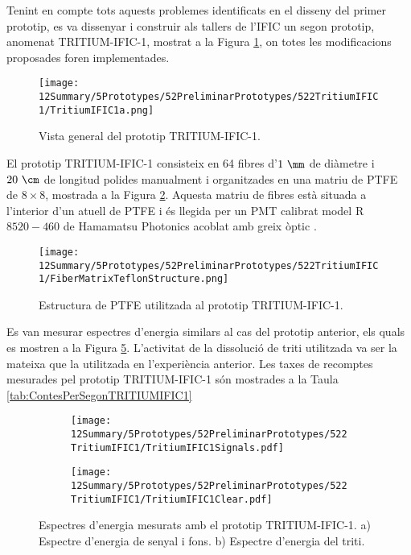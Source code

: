 Tenint en compte tots aquests problemes identificats en el disseny del primer prototip, es va dissenyar i construir als tallers de l'IFIC un segon prototip, anomenat TRITIUM-IFIC-1, mostrat a la Figura \ref{fig:TritumIFIC1s}, on totes les modificacions proposades foren implementades.
\begin{figure}[h]
\centering
\texttt{[image: 12Summary/5Prototypes/52PreliminarPrototypes/522TritiumIFIC1/TritiumIFIC1a.png]}
\caption{Vista general del prototip TRITIUM-IFIC-1.\label{fig:TritumIFIC1s}}
\end{figure}
El prototip TRITIUM-IFIC-1 consisteix en 64 fibres d'$1~\mm$ de diàmetre i $20~\cm$ de longitud polides manualment i organitzades en una matriu de PTFE de $8\times 8$, mostrada a la Figura \ref{fig:EstructuraPTFEFibresTritiumIFIC1}. Aquesta matriu de fibres està situada a l'interior d'un atuell de PTFE i és llegida per un PMT calibrat model R$8520-460$ de Hamamatsu Photonics \cite{DataSheetPMTs} acoblat amb greix òptic \cite{OpticalGrease}.
\begin{figure}[h]
\centering
\texttt{[image: 12Summary/5Prototypes/52PreliminarPrototypes/522TritiumIFIC1/FiberMatrixTeflonStructure.png]}
\caption{Estructura de PTFE utilitzada al prototip TRITIUM-IFIC-1.\label{fig:EstructuraPTFEFibresTritiumIFIC1}}
\end{figure}
Es van mesurar espectres d'energia similars al cas del prototip anterior, els quals es mostren a la Figura \ref{fig:EspectresEnergeticsTRITIUMIFIC1}. L'activitat de la dissolució de triti utilitzada va ser la mateixa que la utilitzada en l'experiència anterior. Les taxes de recomptes mesurades pel prototip TRITIUM-IFIC-1 són mostrades a la Taula \ref{tab:ContesPerSegonTRITIUMIFIC1}

\begin{figure}
\centering
    \begin{subfigure}[b]{1\textwidth}
    \centering
    \texttt{[image: 12Summary/5Prototypes/52PreliminarPrototypes/522TritiumIFIC1/TritiumIFIC1Signals.pdf]}  
    \caption{\label{subfig:EspectreEnergeticSenyalFonsTritiumIFIC1}}
    \end{subfigure}
    \hfill
    \begin{subfigure}[b]{1\textwidth}
    \centering
    \texttt{[image: 12Summary/5Prototypes/52PreliminarPrototypes/522TritiumIFIC1/TritiumIFIC1Clear.pdf]}  
    \caption{\label{subfig:EspectreEnergeticTritiTritiumIFIC1}}
    \end{subfigure}
 \caption{Espectres d'energia mesurats amb el prototip TRITIUM-IFIC-1. a) Espectre d'energia de senyal i fons. b) Espectre d'energia del triti.}
 \label{fig:EspectresEnergeticsTRITIUMIFIC1}
\end{figure}

